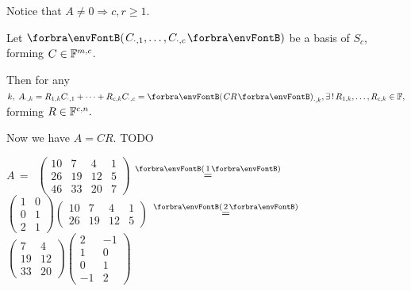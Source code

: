 \documentclass[a4paper, 11pt, UTF8]{article}
\begin{document}
\begin{large}
Notice that $A\neq 0\Rightarrow c,r\geqslant 1.$\par\quad
Let $\Par{C_{\cdot,1},\dots,C_{\cdot,c}}$ be a basis of $S_c$, forming $C\in{\mathbb{F}}^{m,c}$.\par\quad
{}\par\quad
Then for any $k,\;A_{\cdot,k}=R_{1,k}C_{\cdot,1}+\dots+R_{c,k}C_{\cdot,c}=\Par{CR}_{\cdot,k},\exists\,!\,R_{1,k},\dots,R_{c,k}\in\Fbb,$ forming $R\in{\mathbb{F}}^{c,n}.$\par\quad
{}\par\quad
Now we have $A=CR.$ TODO\PfEnd
\Example\par\quad
$A\,=\,$ {\normalsize$\begin{pmatrix} 10 & 7 & 4 & 1 \\ 26 & 19 & 12 & 5\\ 46 & 33 & 20 & 7\end{pmatrix}$
{$\overset{\Par{1}}{=}$}
$\begin{pmatrix} 1 & 0\\ 0 & 1\\ 2 & 1\end{pmatrix}\begin{pmatrix} 10 & 7 & 4 & 1\\ 26 & 19 & 12 & 5\end{pmatrix}$
{$\overset{\Par{2}}{=}$}
$\begin{pmatrix} 7 & 4\\ 19 & 12\\ 33 & 20\end{pmatrix}\begin{pmatrix} 2 & -1\\ 1 & 0\\ 0 & 1\\ -1 & 2\end{pmatrix}$}\par\quad

\end{large}
\end{document}
